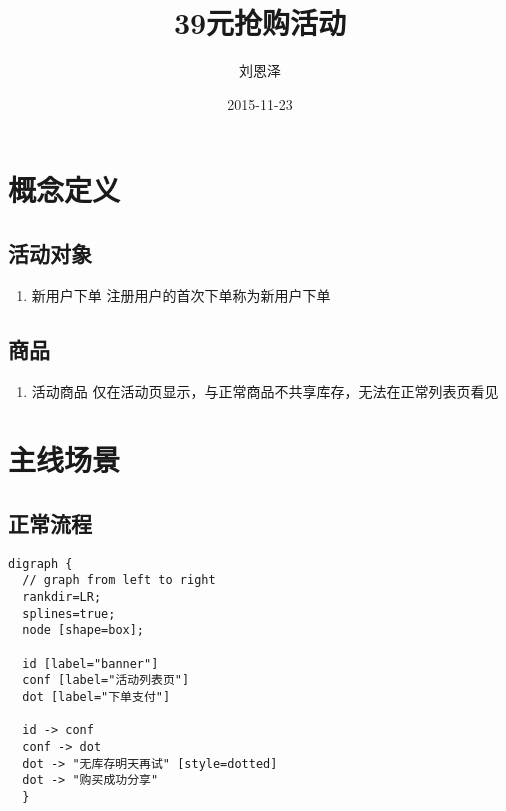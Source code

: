 \documentclass[presentation, bigger]{beamer}
\author{刘恩泽}
\date{2015-11-23}
\title{39元抢购活动}
\begin{document}
\maketitle
\tableofcontents


\section{概念定义}
\label{sec:orgheadline5}
\subsection{活动对象}
\label{sec:orgheadline2}
\begin{enumerate}
\item 新用户下单
\label{sec:orgheadline1}
注册用户的首次下单称为新用户下单
\end{enumerate}

\subsection{商品}
\label{sec:orgheadline4}
\begin{enumerate}
\item 活动商品
\label{sec:orgheadline3}
仅在活动页显示，与正常商品不共享库存，无法在正常列表页看见
\end{enumerate}

\section{主线场景}
\label{sec:orgheadline10}
\subsection{正常流程}
\label{sec:orgheadline6}
\begin{lstlisting}
digraph {
  // graph from left to right
  rankdir=LR;
  splines=true;
  node [shape=box];

  id [label="banner"]
  conf [label="活动列表页"]
  dot [label="下单支付"]

  id -> conf
  conf -> dot
  dot -> "无库存明天再试" [style=dotted]
  dot -> "购买成功分享"
  }
\end{lstlisting}
\end{document}
